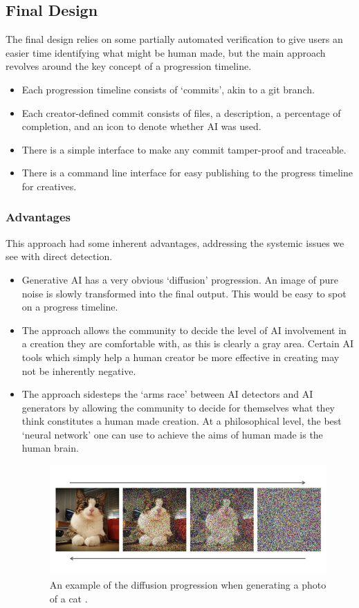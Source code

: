 \documentclass[12pt,a4paper]{article}
\begin{document}
\subsection{Final Design}
The final design relies on some partially automated verification to give users an easier time identifying what might be human made, but the main approach revolves around the key concept of a progression timeline. 
\begin{itemize}
    \item Each progression timeline consists of `commits', akin to a git branch.
    \item Each creator-defined commit consists of files, a description, a percentage of completion, and an icon to denote whether AI was used.
    \item There is a simple interface to make any commit tamper-proof and traceable.
    \item There is a command line interface for easy publishing to the progress timeline for creatives.
\end{itemize}
\subsubsection{Advantages}
This approach had some inherent advantages, addressing the systemic issues we see with direct detection.
\begin{itemize}
    \item Generative AI has a very obvious `diffusion' progression. An image of pure noise is slowly transformed into the final output. This would be easy to spot on a progress timeline.
    \item The approach allows the community to decide the level of AI involvement in a creation they are comfortable with, as this is clearly a gray area. Certain AI tools which simply help a human creator be more effective in creating may not be inherently negative.
    \item The approach sidesteps the `arms race' between AI detectors and AI generators by allowing the community to decide for themselves what they think constitutes a human made creation. At a philosophical level, the best `neural network' one can use to achieve the aims of human made is the human brain.
    \begin{figure}[H]
        \centering
        \includegraphics[scale=0.3]{catDiffusion.jpg}
        \caption{An example of the diffusion progression when generating a photo of a cat \cite{cat}.}
    \end{figure}
\end{itemize}
\end{document}

